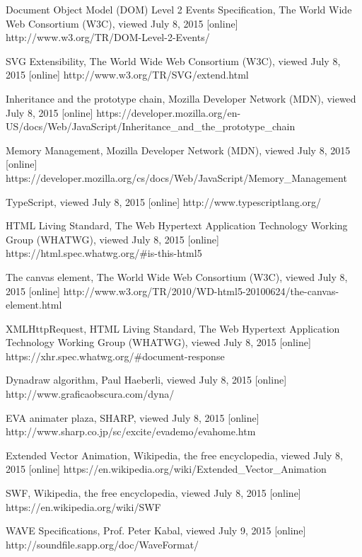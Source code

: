 \begin{thebibliography}{99}
Document Object Model (DOM) Level 2 Events Specification, The World Wide Web Consortium (W3C), viewed July 8, 2015 [online]
http://www.w3.org/TR/DOM-Level-2-Events/


SVG Extensibility, The World Wide Web Consortium (W3C), viewed July 8, 2015 [online]
http://www.w3.org/TR/SVG/extend.html



Inheritance and the prototype chain, Mozilla Developer Network (MDN), viewed July 8, 2015 [online]
https://developer.mozilla.org/en-US/docs/Web/JavaScript/Inheritance\_and\_the\_prototype\_chain

Memory Management, Mozilla Developer Network (MDN), viewed July 8, 2015 [online]
https://developer.mozilla.org/cs/docs/Web/JavaScript/Memory\_Management

TypeScript, viewed July 8, 2015 [online] 
http://www.typescriptlang.org/

HTML Living Standard, The Web Hypertext Application Technology Working Group (WHATWG), viewed July 8, 2015 [online]
https://html.spec.whatwg.org/\#is-this-html5

The canvas element, The World Wide Web Consortium (W3C), viewed July 8, 2015 [online]
http://www.w3.org/TR/2010/WD-html5-20100624/the-canvas-element.html

XMLHttpRequest, HTML Living Standard, The Web Hypertext Application Technology Working Group (WHATWG), viewed July 8, 2015 [online]
https://xhr.spec.whatwg.org/\#document-response


Dynadraw algorithm, Paul Haeberli, viewed July 8, 2015 [online]
http://www.graficaobscura.com/dyna/


EVA animater plaza, SHARP, viewed July 8, 2015 [online]
http://www.sharp.co.jp/sc/excite/evademo/evahome.htm

Extended Vector Animation, Wikipedia, the free encyclopedia, viewed July 8, 2015 [online]
https://en.wikipedia.org/wiki/Extended\_Vector\_Animation

SWF, Wikipedia, the free encyclopedia, viewed July 8, 2015 [online]
https://en.wikipedia.org/wiki/SWF

WAVE Specifications, Prof. Peter Kabal, viewed July 9, 2015 [online]
http://soundfile.sapp.org/doc/WaveFormat/


\end{thebibliography}
